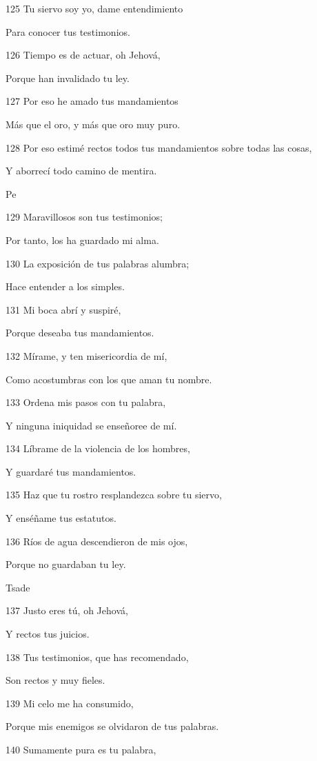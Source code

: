 \par 125 Tu siervo soy yo, dame entendimiento
\par Para conocer tus testimonios.
\par 126 Tiempo es de actuar, oh Jehová,
\par Porque han invalidado tu ley.
\par 127 Por eso he amado tus mandamientos
\par Más que el oro, y más que oro muy puro.
\par 128 Por eso estimé rectos todos tus mandamientos sobre todas las cosas,
\par Y aborrecí todo camino de mentira.
\par Pe
\par 129 Maravillosos son tus testimonios;
\par Por tanto, los ha guardado mi alma.
\par 130 La exposición de tus palabras alumbra;
\par Hace entender a los simples.
\par 131 Mi boca abrí y suspiré,
\par Porque deseaba tus mandamientos.
\par 132 Mírame, y ten misericordia de mí,
\par Como acostumbras con los que aman tu nombre.
\par 133 Ordena mis pasos con tu palabra,
\par Y ninguna iniquidad se enseñoree de mí.
\par 134 Líbrame de la violencia de los hombres,
\par Y guardaré tus mandamientos.
\par 135 Haz que tu rostro resplandezca sobre tu siervo,
\par Y enséñame tus estatutos.
\par 136 Ríos de agua descendieron de mis ojos,
\par Porque no guardaban tu ley.
\par Tsade
\par 137 Justo eres tú, oh Jehová,
\par Y rectos tus juicios.
\par 138 Tus testimonios, que has recomendado,
\par Son rectos y muy fieles.
\par 139 Mi celo me ha consumido,
\par Porque mis enemigos se olvidaron de tus palabras.
\par 140 Sumamente pura es tu palabra,
